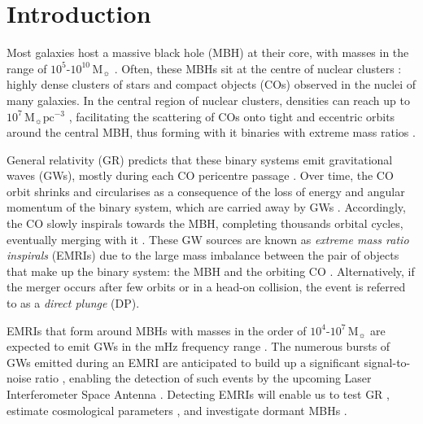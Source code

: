 \documentclass[desactivate]{aa}
\begin{document}
\section{Introduction}

   Most galaxies host a massive black hole (MBH) at their core, with masses in the range of $10^5 \text{-} 10^{10} \, \mathrm{M}_\sun$ \citep{1995ARA&A..33..581K,1998AJ....115.2285M,2013ARA&A..51..511K}. Often, these MBHs sit at the centre of nuclear clusters \citep{1997AJ....114.2366C,2002AJ....123.1389B,2006ApJS..165...57C,2007A&A...469..125S,2009A&A...502...91S,2012ApJS..203....5T}: highly dense clusters of stars and compact objects (COs) observed in the nuclei of many galaxies. In the central region of nuclear clusters, densities can reach up to $10^7 \, \mathrm{M}_\sun  \mathrm{pc}^{-3}$ \citep{2020A&ARv..28....4N}, facilitating the scattering of COs onto tight and eccentric orbits around the central MBH, thus forming with it binaries with extreme mass ratios \citep{2008gady.book.....B,2013degn.book.....M}.
   
   General relativity (GR) predicts that these binary systems emit gravitational waves (GWs), mostly during each CO pericentre passage \citep{1973grav.book.....M}. Over time, the CO orbit shrinks and circularises \citep{1964PhRv..136.1224P} as a consequence of the loss of energy and angular momentum of the binary system, which are carried away by GWs \citep{10.1093/acprof:oso/9780198570745.001.0001}. Accordingly, the CO slowly inspirals towards the MBH, completing thousands orbital cycles, eventually merging with it \citep{2018LRR....21....4A}. These GW sources are known as \textit{extreme mass ratio inspirals} (EMRIs) due to the large mass imbalance between the pair of objects that make up the binary system: the MBH and the orbiting CO \citep{2007CQGra..24R.113A,2022hgwa.bookE..17A}. Alternatively, if the merger occurs after few orbits or in a head-on collision, the event is referred to as a \textit{direct plunge} (DP).

   EMRIs that form around MBHs with masses in the order of $10^4 \text{-} 10^7 \, \mathrm{M}_\sun$ are expected to emit GWs in the mHz frequency range \citep{2004PhRvD..69h2005B,2018LRR....21....4A}. The numerous bursts of GWs emitted during an EMRI are anticipated to build up a significant signal-to-noise ratio \citep{2004PhRvD..69h2005B,2017PhRvD..95j3012B}, enabling the detection of such events by the upcoming Laser Interferometer Space Antenna \citep[LISA,][]{2017arXiv170200786A,2023LRR....26....2A,2024arXiv240207571C}. Detecting EMRIs will enable us to test GR \citep{1997PhRvD..56.1845R,2007PhRvD..75d2003B}, estimate cosmological parameters \citep{2008PhRvD..77d3512M,2021MNRAS.508.4512L}, and investigate dormant MBHs \citep{2010PhRvD..81j4014G,2019ApJ...883L..18G}.
   
\end{document}
